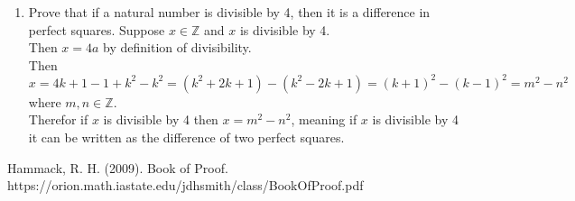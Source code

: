 \documentclass[sigconf]{article}
\begin{document}
\begin{enumerate}
  \item Prove that if a natural number is divisible by 4, then it is a difference in perfect squares.
        Suppose $x\in\mathbb{Z}$ and $x$ is divisible by 4.\\
        Then $x=4a$ by definition of divisibility.\\
        Then $x=4k+1-1+k^2-k^2=(k^2+2k+1)-(k^2-2k+1)=(k+1)^2-(k-1)^2=m^2-n^2$ where $m,n\in\mathbb{Z}$.\\
        Therefor if $x$ is divisible by 4 then $x=m^2-n^2$, meaning if $x$ is divisible by 4 it can be written as the difference of two perfect squares.
\end{enumerate}


Hammack, R. H. (2009). Book of Proof.\\ https://orion.math.iastate.edu/jdhsmith/class/BookOfProof.pdf



\end{document}
